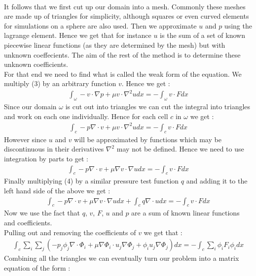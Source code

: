 \documentclass[11pt,twoside,a4paper]{article}
\begin{document}
\\
It follows that we first cut up our domain into a mesh. Commonly these meshes are made up of triangles for simplicity, although squares or even curved elements for simulations on a sphere are also used. Then we approximate $u$ and $p$ using the lagrange element. Hence we get that for instance $u$ is the sum of a set of known piecewise linear functions (as they are determined by the mesh) but with unknown coeffecients. The aim of the rest of the method is to determine these unknown coefficients.\\
For that end we need to find what is called the weak form of the equation. We multiply (3) by an arbitrary function $v$. Hence we get :
\begin{align*}
\int_{\omega} -v \cdot \nabla p + \mu v \cdot \nabla^2 u dx = -\int_{\omega} v \cdot F dx
\end{align*}
Since our domain $\omega$ is cut out into triangles we can cut the integral into triangles and work on each one individually. Hence for each cell $c$ in $\omega$ we get : 
\begin{align*}
\int_{c} - p \nabla \cdot v + \mu v \cdot \nabla^2 u dx =  -\int_{c} v \cdot F dx
\end{align*}
However since $u$ and $v$ will be approximated by functions which may be discontinuous in their derivatives $\nabla^2$ may not be defined. Hence we need to use integration by parts to get :  
\begin{align*}
\int_{c} - p \nabla \cdot v + \mu \nabla v \cdot \nabla u dx = -\int_{c} v \cdot F dx
\end{align*}
Finally multiplying (4) by a similar pressure test function $q$ and adding it to the left hand side of the above we get :
\begin{align}
\int_{c} - p \nabla \cdot v + \mu \nabla v \cdot \nabla u dx + \int_{c} q \nabla \cdot u dx = -\int_{c} v \cdot F dx
\end{align}
Now we use the fact that $q$, $v$, $F$, $u$ and $p$ are a sum of known linear functions and coefficients.\\
Pulling out and removing the coefficients of $v$ we get that :
\begin{align*}
 \int_{c} \sum_i \sum_j ( - p_j \phi_j \nabla  \cdot \Phi_i + \mu \nabla \Phi_i \cdot u_j \nabla \Phi_j +   \phi_i u_j \nabla \Phi_j) dx = -\int_{c} \sum_i \phi_i F_i \phi_i dx
\end{align*}
Combining all the triangles we can eventually turn our problem into a matrix equation of the form :
\end{document}
